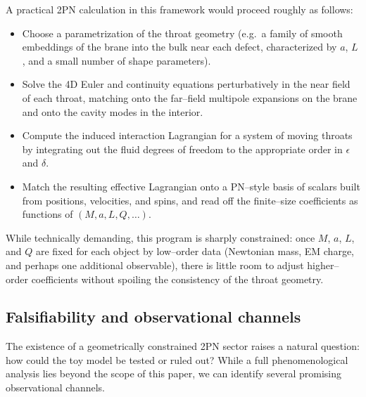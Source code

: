 \documentclass[12pt]{article}
\begin{document}
A practical 2PN calculation in this framework would proceed roughly as
follows:

\begin{itemize}
  \item Choose a parametrization of the throat geometry (e.g.\ a family of
        smooth embeddings of the brane into the bulk near each defect,
        characterized by $a$, $L$, and a small number of shape parameters).

  \item Solve the 4D Euler and continuity equations perturbatively in the
        near field of each throat, matching onto the far--field multipole
        expansions on the brane and onto the cavity modes in the interior.

  \item Compute the induced interaction Lagrangian for a system of moving
        throats by integrating out the fluid degrees of freedom to the
        appropriate order in $\epsilon$ and $\delta$.

  \item Match the resulting effective Lagrangian onto a PN--style basis of
        scalars built from positions, velocities, and spins, and read off
        the finite--size coefficients as functions of $(M,a,L,Q,\ldots)$.
\end{itemize}

While technically demanding, this program is sharply constrained: once $M$,
$a$, $L$, and $Q$ are fixed for each object by low--order data (Newtonian
mass, EM charge, and perhaps one additional observable), there is little
room to adjust higher--order coefficients without spoiling the consistency
of the throat geometry.

\subsection{Falsifiability and observational channels}
\label{subsec:falsifiability}

The existence of a geometrically constrained 2PN sector raises a natural
question: how could the toy model be tested or ruled out?  While a full
phenomenological analysis lies beyond the scope of this paper, we can
identify several promising observational channels.
\end{document}
